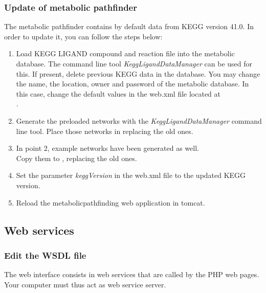 \documentclass{book}
\begin{document}
\subsubsection{Update of metabolic pathfinder}
The metabolic pathfinder contains by default data from KEGG version 41.0.
In order to update it, you can follow the steps below:

\begin{enumerate}

\item Load KEGG LIGAND compound and reaction file into the metabolic database.
      The command line tool \textit{KeggLigandDataManager} can be used for this.
      If present, delete previous KEGG data in the database. You may change the name,
      the location, owner and password of the metabolic database. In this case, change the
      default values in the web.xml file located at\\
      .

\item Generate the preloaded networks with the \textit{KeggLigandDataManager} command line tool.
      Place those networks in  replacing the old ones.

\item In point 2, example networks have been generated as well.\\
      Copy them to
      , replacing the old ones.

\item Set the parameter \textit{keggVersion} in the web.xml file to the updated KEGG version.

\item Reload the metabolicpathfinding web application in tomcat.

\end{enumerate}

\subsection{Web services}

\subsubsection{Edit the WSDL file}
The web interface consists in web services that are called by the PHP web pages. Your computer must thus act as web service server.
\end{document}

